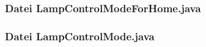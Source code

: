 \documentclass[11pt,ngerman]{article}
\begin{document}
\subsubsection{Datei LampControlModeForHome.java}

\vspace{.5cm}

\subsubsection{Datei LampControlMode.java}

\vspace{.5cm}
\end{document}
